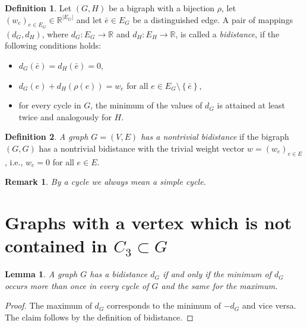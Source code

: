 \documentclass[a4paper, 11pt]{article}
\newcommand{\RR}{\mathbb{R}}
\newtheorem{lem}[thm]{Lemma}
\newtheorem*{rem}{Remark}
\theoremstyle{definition}
\newtheorem{defn}{Definition}[section]
\begin{document}
\begin{defn}
Let $(G,H)$ be a bigraph with a bijection $\rho$, let $(w_e)_{e\in E_G}\in \RR^{|E_G|}$ and let $\bar{e}\in E_G$ be a distinguished edge. A pair of mappings $(d_G,d_H)$, where $d_G:E_G\rightarrow \RR$ and $d_H:E_H\rightarrow \RR$, is called a \emph{bidistance}, if the following conditions holds:
\begin{itemize}
\item $d_G(\bar{e})=d_H(\bar{e})=0$,
\item $d_G(e)+d_H(\rho(e))=w_e$ for all $e\in E_G\setminus \left\{\bar{e}\right\}$,
\item for every cycle in $G$, the minimum of the values of $d_G$ is attained at least twice and analogously for $H$.
\end{itemize}
\end{defn}



\begin{defn}
\emph{A graph $G=(V,E)$ has a nontrivial bidistance} if the bigraph $(G,G)$ has a nontrivial bidistance with the trivial weight vector $w=(w_e)_{e\in E}$, i.e., $w_e=0$ for all $e\in E$.
\end{defn}

\begin{rem}
By \emph{a cycle} we always mean a simple cycle.
\end{rem}


\section{Graphs with a vertex which is not contained in $C_3\subset G$}
\begin{lem}
A graph $G$ has a bidistance $d_G$ if and only if the minimum of $d_G$ occurs more than once in every cycle of $G$ and the same for the maximum.
\end{lem}
\begin{proof}
The maximum of $d_G$ corresponds to the minimum of $-d_G$ and vice versa. The claim follows by the definition of bidistance.
\end{proof}
\end{document}
